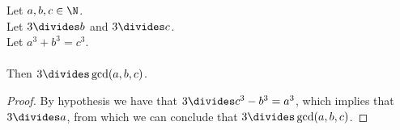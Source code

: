 \begin{lemma}
  \label{lmm:three_dvd_gcd_of_dvd_b_of_dvd_c}
  \leanok
  Let $a, b, c \in \N$. \\
  Let $3 \divides b$ and $3 \divides c$. \\
  Let $a ^ 3 + b ^ 3 = c ^ 3$. \\\\
  Then $3 \divides \gcd(a,b,c)$.
\end{lemma}
\begin{proof}
  \leanok
  By hypothesis we have that $3 \divides c^3 - b^3 = a^3$, which implies that $3 \divides a$,
  from which we can conclude that $3 \divides \gcd(a,b,c)$.
\end{proof}


